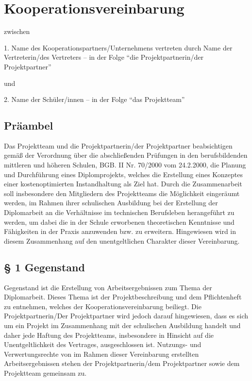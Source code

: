 \chapter{Kooperationsvereinbarung}

zwischen 

1. Name des Kooperationspartners/Unternehmens vertreten durch Name der Vertreterin/des Vertreters – in der Folge "`die Projektpartnerin/der Projektpartner"' 

und 

2. Name der Schüler/innen – in der Folge "`das Projektteam"'

\section*{Präambel}

Das Projektteam und die Projektpartnerin/der Projektpartner beabsichtigen gemäß der Verordnung über die abschließenden Prüfungen in den berufsbildenden mittleren und höheren Schulen, BGB. II Nr. 70/2000 vom 24.2.2000, die Planung und Durchführung eines Diplomprojekts, welches die Erstellung eines Konzeptes einer kostenoptimierten Instandhaltung als Ziel hat. Durch die Zusammenarbeit soll insbesondere den Mitgliedern des Projektteams die Möglichkeit eingeräumt werden, im Rahmen ihrer schulischen Ausbildung bei der Erstellung der Diplomarbeit an die Verhältnisse im technischen Berufsleben herangeführt zu werden, um dabei die in der Schule erworbenen theoretischen Kenntnisse und Fähigkeiten in der Praxis anzuwenden bzw. zu erweitern. Hingewiesen wird in diesem Zusammenhang auf den unentgeltlichen Charakter dieser Vereinbarung. 

\section*{§ 1 Gegenstand}
Gegenstand ist die Erstellung von Arbeitsergebnissen zum Thema der Diplomarbeit. Dieses Thema ist der Projektbeschreibung und dem Pflichtenheft zu entnehmen, welches der Kooperationsvereinbarung beiliegt. Die Projektpartnerin/Der Projektpartner wird jedoch darauf hingewiesen, dass es sich um ein Projekt im Zusammenhang mit der schulischen Ausbildung handelt und daher jede Haftung des Projektteams, insbesondere in Hinsicht auf die Unentgeltlichkeit des Vertrages, ausgeschlossen ist. Nutzungs- und Verwertungsrechte von im Rahmen dieser Vereinbarung erstellten Arbeitsergebnissen stehen der Projektpartnerin/dem Projektpartner sowie dem Projektteam gemeinsam zu. 

